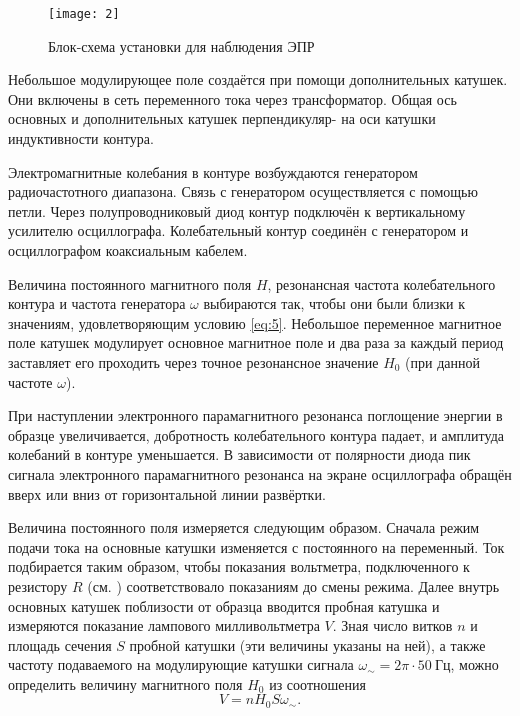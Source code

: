 \documentclass[a4paper, 12pt]{article}
\begin{document}
\begin{wrapfigure}{l}{0.5\linewidth}
    \texttt{[image: 2]}
    \caption{Блок-схема установки для наблюдения ЭПР}
    \label{fig:2}
\end{wrapfigure}

Небольшое модулирующее поле создаётся при помощи дополнительных
катушек. Они включены в сеть переменного тока через трансформатор.
Общая ось основных и дополнительных катушек перпендикуляр- на оси
катушки индуктивности контура.

Электромагнитные колебания в контуре возбуждаются генератором
радиочастотного диапазона. Связь с генератором осуществляется с
помощью петли. Через полупроводниковый диод контур подключён к
вертикальному усилителю осциллографа. Колебательный контур соединён с
генератором и осциллографом коаксиальным кабелем.

Величина постоянного магнитного поля $H$, резонансная частота
колебательного контура и частота генератора $\omega$ выбираются так, чтобы
они были близки к значениям, удовлетворяющим условию \eqref{eq:5}. Небольшое
переменное магнитное поле катушек модулирует основное магнитное поле
и два раза за каждый период заставляет его проходить через точное
резонансное значение $H_0$ (при данной частоте $\omega$).

При наступлении электронного парамагнитного резонанса поглощение
энергии в образце увеличивается, добротность колебательного контура
падает, и амплитуда колебаний в контуре уменьшается. В зависимости
от полярности диода пик сигнала электронного парамагнитного
резонанса на экране осциллографа обращён вверх или вниз от
горизонтальной линии развёртки.

Величина постоянного поля измеряется следующим образом.
Сначала режим подачи тока на основные катушки изменяется с
постоянного на переменный. Ток подбирается таким образом, чтобы
показания вольтметра, подключенного к резистору $R$ (см. )
соответствовало показаниям до смены режима. Далее внутрь основных
катушек поблизости от образца вводится пробная катушка и измеряются
показание лампового милливольтметра $V$. Зная число витков $n$ и площадь
сечения $S$ пробной катушки (эти величины указаны на ней), а также
частоту подаваемого на модулирующие катушки сигнала $\omega _{\sim} =
2\pi \cdot 50\: \text{Гц}$,
можно определить величину магнитного поля $H_0$ из соотношения
\begin{equation}
    V = n H_0 S \omega _{\sim}.
    \label{eq:4}
\end{equation}
\end{document}
